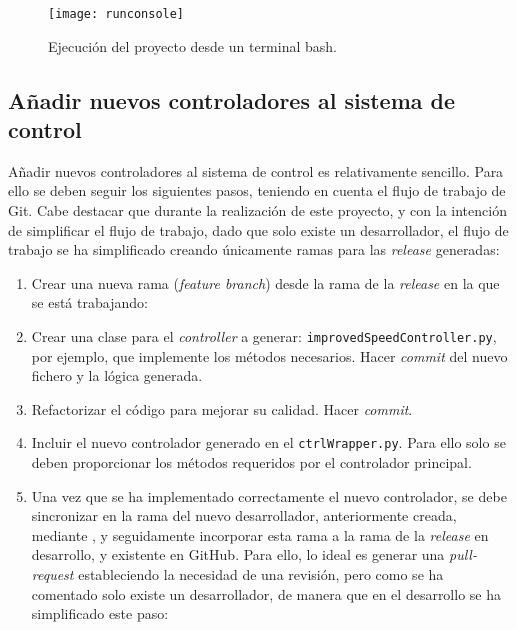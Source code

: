 \begin{figure}[H]
	\centering
	\texttt{[image: runconsole]}
	\caption[Ejecución del proyecto desde terminal]{Ejecución del proyecto desde un terminal bash.}\label{fig:runconsole}
\end{figure}

\subsection{Añadir nuevos controladores al sistema de control}

Añadir nuevos controladores al sistema de control es relativamente sencillo. Para ello se deben seguir los siguientes pasos, teniendo en cuenta el flujo de trabajo de Git. Cabe destacar que durante la realización de este proyecto, y con la intención de simplificar el flujo de trabajo, dado que solo existe un desarrollador, el flujo de trabajo se ha simplificado creando únicamente ramas para las \emph{release} generadas: 
\begin{enumerate}
\item Crear una nueva rama (\emph{feature branch}) desde la rama de la \emph{release} en la que se está trabajando:\\ 
  
\item Crear una clase para el \emph{controller} a generar: \texttt{improvedSpeedController.py}, por ejemplo, que implemente los métodos necesarios. Hacer \emph{commit} del nuevo fichero y la lógica generada.
\item Refactorizar el código para mejorar su calidad. Hacer \emph{commit}.
\item Incluir el nuevo controlador generado en el \texttt{ctrlWrapper.py}. Para ello solo se deben proporcionar los métodos requeridos por el controlador principal. 
\item Una vez que se ha implementado correctamente el nuevo controlador, se debe sincronizar en la rama del nuevo desarrollador, anteriormente creada, mediante , y seguidamente incorporar esta rama a la rama de la \emph{release} en desarrollo, y existente en GitHub. Para ello, lo ideal es generar una \emph{pull-request} estableciendo la necesidad de una revisión, pero como se ha comentado solo existe un desarrollador, de manera que en el desarrollo se ha simplificado este paso:\\ 
\end{enumerate}

